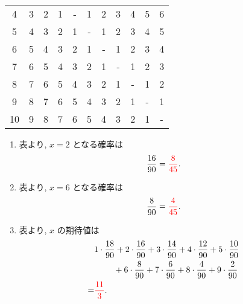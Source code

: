 \begin{qenumerate}
{\begin{table}[H]
\begin{tabular}{c|cccccccccc}
				 4 & 3 & 2 & 1 & - & 1 & 2 & 3 & 4 & 5 &  6 \\
				 5 & 4 & 3 & 2 & 1 & - & 1 & 2 & 3 & 4 &  5 \\
				 6 & 5 & 4 & 3 & 2 & 1 & - & 1 & 2 & 3 &  4 \\
				 7 & 6 & 5 & 4 & 3 & 2 & 1 & - & 1 & 2 &  3 \\
				 8 & 7 & 6 & 5 & 4 & 3 & 2 & 1 & - & 1 &  2 \\
				 9 & 8 & 7 & 6 & 5 & 4 & 3 & 2 & 1 & - &  1 \\
				10 & 9 & 8 & 7 & 6 & 5 & 4 & 3 & 2 & 1 &  - \\
			\end{tabular}
		\end{table}
		\begin{enumerate}
			\item{
				表より, $x = 2$ となる確率は
				\begin{align}
					\frac{16}{90} = \textcolor{red}{\frac{8}{45}}.
				\end{align}
			}
			\item{
				表より, $x = 6$ となる確率は
				\begin{align}
					\frac{8}{90} = \textcolor{red}{\frac{4}{45}}.
				\end{align}
			}
			\item{
				表より, $x$ の期待値は
				\begin{align}
					&1\cdot\frac{18}{90} + 2\cdot\frac{16}{90} + 3\cdot\frac{14}{90} + 4\cdot\frac{12}{90} + 5\cdot\frac{10}{90} \\
						&\textbf{\quad\quad} + 6\cdot\frac{8}{90} + 7\cdot\frac{6}{90} + 8\cdot\frac{4}{90} + 9\cdot\frac{2}{90} \\
						=& \textcolor{red}{\frac{11}{3}}.
				\end{align}
			}
		\end{enumerate}
	}
\end{qenumerate}

